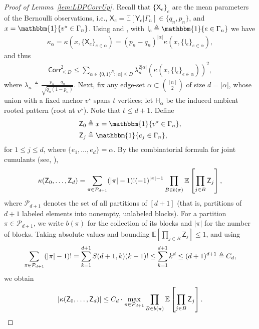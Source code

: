 \documentclass[12pt]{article}
\newcommand{\Ind}{\mathbbm{1}}
\newcommand{\calP}{{\cal P}}
\newcommand{\pp}[1]{\left[#1\right]}
\newcommand{\s}[1]{\mathsf{#1}}
\begin{document}
\begin{proof}[Proof of Lemma~\ref{lem:LDPCorrUp}]
Recall that $\{\s{X}_e\}_e$ are the mean parameters of the Bernoulli observations, i.e., $\s{X}_e=\mathbb{E}[\s{Y}_e\vert\Gamma_n]\in\{q_n,p_n\}$, and $x=\Ind\{v^\star\in\Gamma_n\}$. Using \cite[Claim 2.14]{SchrammWein2022} and \cite[Prop. 2.13]{SchrammWein2022}, with $\s{I}_e\triangleq\Ind\{e\in \Gamma_n\}$ we have
\begin{align}
\kappa_\alpha=\kappa(x,\{\s{X}_e\}_{e\in\alpha})=(p_n-q_n)^{|\alpha|}\kappa(x,\{\s{I}_e\}_{e\in\alpha}),
\end{align}
and thus
\begin{align}
\s{Corr}_{\leq D}^2 \leq \sum_{\alpha\in\{0,1\}^N:|\alpha|\le D} \lambda_n^{2|\alpha|}(\kappa(x,\{\s{I}_e\}_{e\in\alpha}))^2,\label{eqn:GroupSum}
\end{align}
where $\lambda_n\triangleq\frac{p_n-q_n}{\sqrt{q_n(1-p_n)}}$. Next, fix any edge-set $\alpha\subset \binom{[n]}{2}$ of size $d = |\alpha|$, whose union with a fixed anchor $v^\star$ spans $t$ vertices; let $\s{H}_\alpha$ be the induced ambient rooted pattern (root at $v^\star$). Note that $t \leq d+1$. Define
\begin{align}
\s{Z}_0&\triangleq x=\Ind\{v^\star\in \Gamma_n\},\\
\s{Z}_j&\triangleq\Ind\{e_j\in \Gamma_n\},
\end{align}
for $1\le j\le d$, where $\{e_1,\dots,e_d\}=\alpha$. By the combinatorial formula for joint cumulants (see, \cite[Def. 2.10]{SchrammWein2022}),
\begin{align}
\kappa(\s{Z}_0,\dots,\s{Z}_d)=\sum_{\pi\in\calP_{d+1}} (|\pi|-1)!  (-1)^{|\pi|-1}\prod_{B\in b(\pi)}\mathbb{E}\pp{\prod_{j\in B}\s{Z}_j},
\end{align}
where $\mathcal{P}_{d+1}$ denotes the set of all partitions of $[d+1]$ (that is, partitions of $d+1$ labeled elements into nonempty, unlabeled blocks). For a partition $\pi\in\mathcal{P}_{d+1}$, we write $b(\pi)$ for the collection of its blocks and $|\pi|$ for the number of blocks. Taking absolute values and bounding $\mathbb{E}\pp{\prod_{j\in B}\s{Z}_j}\le1$, and using
\begin{align}
\sum_{\pi\in\calP_{d+1}} (|\pi|-1)! = \sum_{k=1}^{d+1} S(d+1,k)(k-1)!\le \sum_{k=1}^{d+1} k^d \le (d+1)^{d+1}\triangleq C_d,
\end{align}
we obtain
\begin{align}
|\kappa(\s{Z}_0,\dots,\s{Z}_d)| \le C_d\cdot\max_{\pi\in\calP_{d+1}} \prod_{B\in b(\pi)}\mathbb{E}\pp{\prod_{j\in B}\s{Z}_j}.

\end{align}
\end{proof}
\end{document}
